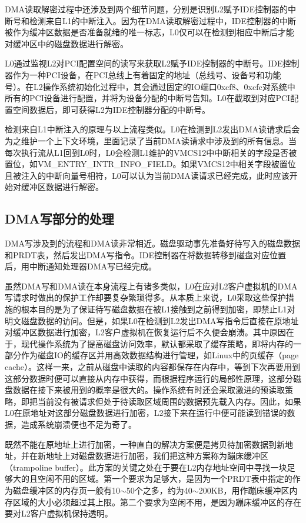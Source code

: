 DMA读取解密过程中还涉及到两个细节问题，分别是识别L2赋予IDE控制器的中断号和检测来自L1的中断注入。因为在DMA读取解密过程中，IDE控制器的中断被作为缓冲区数据是否准备就绪的唯一标志，L0仅可以在检测到相应中断后才能对缓冲区中的磁盘数据进行解密。

L0通过监视L2对PCI配置空间的读写来获取L2赋予IDE控制器的中断号。IDE控制器作为一种PCI设备，在PCI总线上有着固定的地址（总线号、设备号和功能号）。在L2操作系统初始化过程中，其会通过固定的IO端口0xcf8、0xcfc对系统中所有的PCI设备进行配置，并将为设备分配的中断号告知。L0在截取到对应PCI配置空间数据后，即可获得L2为IDE控制器分配的中断号。

检测来自L1中断注入的原理与以上流程类似。L0在检测到L2发出DMA读请求后会为之维护一个上下文环境，里面记录了当前DMA读请求中涉及到的所有信息。当每次执行流从L1回到L0时，L0会检测L1维护的VMCS12中中断相关的字段是否被置位，如VM\_ENTRY\_INTR\_INFO\_FIELD。如果VMCS12中相关字段被置位且被注入的中断向量号相符，L0可以认为当前DMA读请求已经完成，此时应该开始对缓冲区数据进行解密。

\subsection{DMA写部分的处理}

DMA写涉及到的流程和DMA读非常相近。磁盘驱动事先准备好待写入的磁盘数据和PRDT表，然后发出DMA写指令。IDE控制器在将数据转移到磁盘对应位置后，用中断通知处理器DMA写已经完成。

虽然DMA写和DMA读在本身流程上有诸多类似，L0在应对L2客户虚拟机的DMA写请求时做出的保护工作却要复杂繁琐得多。从本质上来说，L0采取这些保护措施的根本目的是为了保证待写磁盘数据在被L1接触到之前得到加密，即禁止L1对明文磁盘数据的访问。但是，如果L0在检测到L2发出DMA写指令后直接在原地址对缓冲区数据进行加密，L2客户虚拟机在恢复运行后不久便会崩溃。其中原因在于，现代操作系统为了提高磁盘访问效率，默认都采取了缓存策略，即将内存的一部分作为磁盘IO的缓存区并用高效数据结构进行管理，如Linux中的页缓存（page cache）。这样一来，之前从磁盘中读取的内容都保存在内存中，等到下次再要用到这部分数据时便可以直接从内存中获得，而根据程序运行的局部性原理，这部分磁盘数据在接下来被用到的概率是很大的。操作系统有时还会采取激进的预读取策略，即把当前没有被请求但处于待读取区域周围的数据预先载入内存。因此，如果L0在原地址对这部分磁盘数据进行加密，L2接下来在运行中便可能读到错误的数据，造成系统崩溃便也不足为奇了。

既然不能在原地址上进行加密，一种直白的解决方案便是拷贝待加密数据到新地址，并在新地址上对磁盘数据进行加密，我们把这种方案称为蹦床缓冲区（trampoline buffer）。此方案的关键之处在于要在L2内存地址空间中寻找一块足够大的且空闲不用的区域。第一个要求为足够大，是因为一个PRDT表中指定的作为磁盘缓冲区的内存页一般有10$\sim$50个之多，约为40$\sim$200KB，用作蹦床缓冲区内存区域的大小必须超过其上限。第二个要求为空闲不用，是因为蹦床缓冲区的存在要对L2客户虚拟机保持透明。

